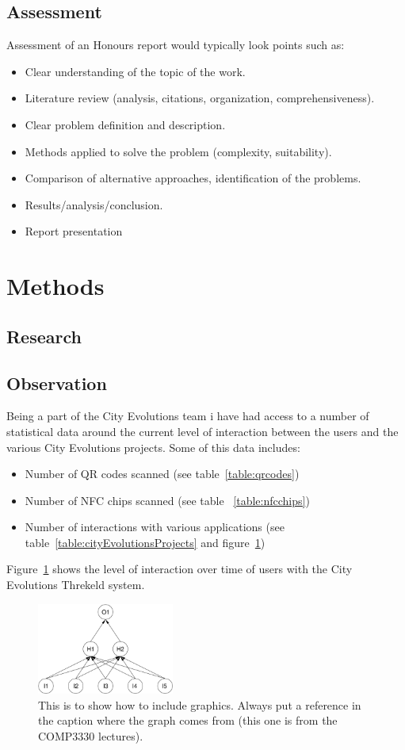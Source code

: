 \documentclass[a4,12pt]{article}
\begin{document}
\subsection{Assessment} \label{sec:assessment}
Assessment of an Honours report would typically look points such as:
\begin{itemize}
\item Clear understanding of the topic of the work.
\item Literature review (analysis, citations, organization, comprehensiveness).
\item Clear problem definition and description.
\item Methods applied to solve the problem (complexity, suitability).
\item Comparison of alternative approaches, identification of the problems.
\item Results/analysis/conclusion.
\item Report presentation
\end{itemize}
%
\section{Methods}
\subsection{Research}
\subsection{Observation}
Being a part of the City Evolutions team i have had access to a number of statistical data around the current level of interaction between the users and the various City Evolutions projects. Some of this data includes:
\begin{itemize}
    \item{Number of QR codes scanned (see table~\ref{table:qrcodes})}
    \item{Number of NFC chips scanned (see table ~\ref{table:nfcchips})}
    \item{Number of interactions with various applications (see table~\ref{table:cityEvolutionsProjects} and figure~\ref{fig:nn1})}
\end{itemize}
Figure~\ref{fig:nn1} shows the level of interaction over time of users with the City Evolutions Threkeld system.
\begin{figure}[htbp]
\begin{center}
    \leavevmode
    \includegraphics[width=45mm]{figure.pdf}
\caption{This is to show how to include graphics. Always put a reference in the caption where the graph comes from (this one is from the COMP3330 lectures).}
\label{fig:nn1}
\end{center}
\end{figure}
\end{document}
